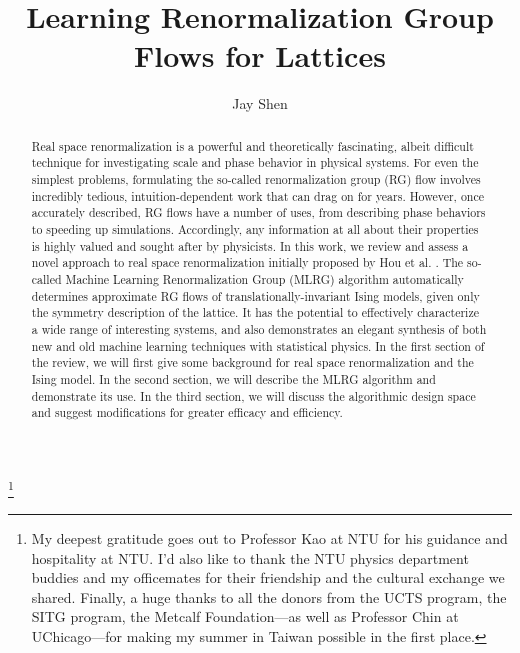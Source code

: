\documentclass[%
    reprint,
    amsmath,amssymb,
    aps,
]{revtex4-2}
\begin{document}

\title{Learning Renormalization Group Flows for Lattices}

\author{Jay Shen}
\thanks{
    My deepest gratitude goes out to Professor Kao at NTU for his guidance and hospitality at NTU. I'd also like to thank the NTU physics department buddies and my officemates for their friendship and the cultural exchange we shared. Finally, a huge thanks to all the donors from the UCTS program, the SITG program, the Metcalf Foundation—as well as Professor Chin at UChicago—for making my summer in Taiwan possible in the first place. 
}

\begin{abstract}

    Real space renormalization is a powerful and theoretically fascinating, albeit 
    difficult technique for investigating scale and phase behavior in physical systems. For even the simplest problems, formulating the so-called renormalization group (RG) flow involves incredibly tedious, intuition-dependent work that can drag on for years. However, once accurately described, RG flows have a number of uses, from describing phase behaviors to speeding up simulations. Accordingly, any information at all about their properties is highly valued and sought after by physicists. In this work, we review and assess a novel approach to real space renormalization initially proposed by Hou et al. \cite{mlrg}. The so-called Machine Learning Renormalization Group (MLRG) algorithm automatically determines approximate RG flows of translationally-invariant Ising models, given only the symmetry description of the lattice. It has the potential to effectively characterize a wide range of interesting systems, and also demonstrates an elegant synthesis of both new and old machine learning techniques with statistical physics. In the first section of the review, we will first give some background for real space renormalization and the Ising model. In the second section, we will describe the MLRG algorithm and demonstrate its use. In the third section, we will discuss the algorithmic design space and suggest modifications for greater efficacy and efficiency. 

\end{abstract}

\maketitle
\end{document}

